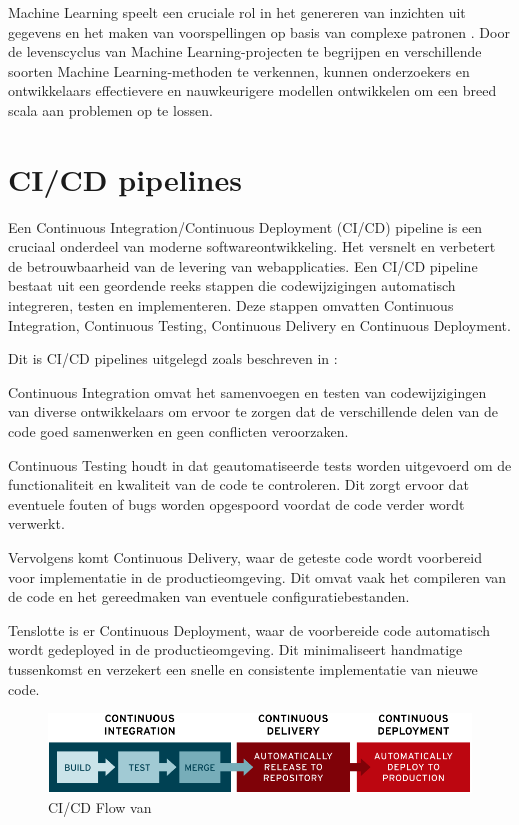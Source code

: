 Machine Learning speelt een cruciale rol in het genereren van inzichten uit gegevens en het maken van voorspellingen op basis van complexe patronen \autocite{Jordan2015}. Door de levenscyclus van Machine Learning-projecten te begrijpen en verschillende soorten Machine Learning-methoden te verkennen, kunnen onderzoekers en ontwikkelaars effectievere en nauwkeurigere modellen ontwikkelen om een breed scala aan problemen op te lossen.
\section{CI/CD pipelines}

Een Continuous Integration/Continuous Deployment (CI/CD) pipeline is een cruciaal onderdeel van moderne softwareontwikkeling. Het versnelt en verbetert de betrouwbaarheid van de levering van webapplicaties. Een CI/CD pipeline bestaat uit een geordende reeks stappen die codewijzigingen automatisch integreren, testen en implementeren. Deze stappen omvatten Continuous Integration, Continuous Testing, Continuous Delivery en Continuous Deployment.

Dit is CI/CD pipelines uitgelegd zoals beschreven in \textcite{NaveenVemuri2024}:

Continuous Integration omvat het samenvoegen en testen van codewijzigingen van diverse ontwikkelaars om ervoor te zorgen dat de verschillende delen van de code goed samenwerken en geen conflicten veroorzaken.

Continuous Testing houdt in dat geautomatiseerde tests worden uitgevoerd om de functionaliteit en kwaliteit van de code te controleren. Dit zorgt ervoor dat eventuele fouten of bugs worden opgespoord voordat de code verder wordt verwerkt.

Vervolgens komt Continuous Delivery, waar de geteste code wordt voorbereid voor implementatie in de productieomgeving. Dit omvat vaak het compileren van de code en het gereedmaken van eventuele configuratiebestanden.

Tenslotte is er Continuous Deployment, waar de voorbereide code automatisch wordt gedeployed in de productieomgeving. Dit minimaliseert handmatige tussenkomst en verzekert een snelle en consistente implementatie van nieuwe code.\newline

\begin{figure}[h]
    \includegraphics[width=\linewidth]{cdci.png}
    \caption{CI/CD Flow van \autocite{RedHat2023}}
    \label{fig:CICD_flow}
\end{figure}
  
